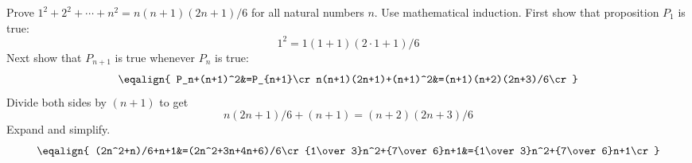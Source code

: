 
Prove $1^2+2^2+\cdots+n^2=n(n+1)(2n+1)/6$ for all natural numbers $n$.
\medskip
Use mathematical induction.
First show that proposition $P_1$ is true:
$$1^2=1(1+1)(2\cdot1+1)/6$$
Next show that $P_{n+1}$ is true whenever $P_n$ is true:
$$\eqalign{
P_n+(n+1)^2&=P_{n+1}\cr
n(n+1)(2n+1)+(n+1)^2&=(n+1)(n+2)(2n+3)/6\cr
}$$
Divide both sides by $(n+1)$ to get
$$n(2n+1)/6+(n+1)=(n+2)(2n+3)/6$$
Expand and simplify.
$$\eqalign{
(2n^2+n)/6+n+1&=(2n^2+3n+4n+6)/6\cr
{1\over3}n^2+{7\over6}n+1&={1\over3}n^2+{7\over6}n+1\cr
}$$
